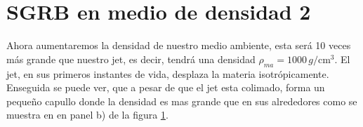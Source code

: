 \documentclass[12pt,a4paper]{book}
\begin{document}
\section{SGRB en medio de densidad 2}

Ahora aumentaremos la densidad de nuestro medio ambiente, esta será 10 veces más grande que nuestro jet, es decir, tendrá una densidad $\rho_{ma} = 1000 \, g/\mathrm{cm}^3 $. El jet, en sus primeros instantes de vida, desplaza la materia isotrópicamente. Enseguida se puede ver, que a pesar de que el jet esta colimado, forma un pequeño capullo donde la densidad es mas grande que en sus alrededores como se muestra en en panel b) de la figura \ref{fig:medio_ambiente_1000}.

\begin{figure}[H] \label{fig:medio_ambiente_1000}
\centering
{}

\end{figure}
\end{document}
